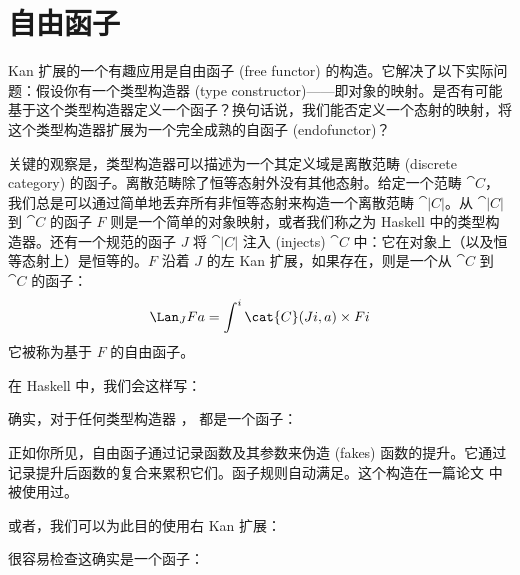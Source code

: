 \section{自由函子}

Kan 扩展的一个有趣应用是自由函子 (free functor) 的构造。它解决了以下实际问题：假设你有一个类型构造器 (type constructor)——即对象的映射。是否有可能基于这个类型构造器定义一个函子？换句话说，我们能否定义一个态射的映射，将这个类型构造器扩展为一个完全成熟的自函子 (endofunctor)？

关键的观察是，类型构造器可以描述为一个其定义域是离散范畴 (discrete category) 的函子。离散范畴除了恒等态射外没有其他态射。给定一个范畴 $\cat{C}$，我们总是可以通过简单地丢弃所有非恒等态射来构造一个离散范畴 $\cat{|C|}$。从 $\cat{|C|}$ 到 $\cat{C}$ 的函子 $F$ 则是一个简单的对象映射，或者我们称之为 Haskell 中的类型构造器。还有一个规范的函子 $J$ 将 $\cat{|C|}$ 注入 (injects) $\cat{C}$ 中：它在对象上（以及恒等态射上）是恒等的。$F$ 沿着 $J$ 的左 Kan 扩展，如果存在，则是一个从 $\cat{C}$ 到 $\cat{C}$ 的函子：
\[\Lan_{J}F a = \int^i \cat{C}(J i, a)\times{}F i\]
它被称为基于 $F$ 的自由函子。

在 Haskell 中，我们会这样写：

确实，对于任何类型构造器 ， 都是一个函子：

正如你所见，自由函子通过记录函数及其参数来伪造 (fakes) 函数的提升。它通过记录提升后函数的复合来累积它们。函子规则自动满足。这个构造在一篇论文  中被使用过。

或者，我们可以为此目的使用右 Kan 扩展：

很容易检查这确实是一个函子：


